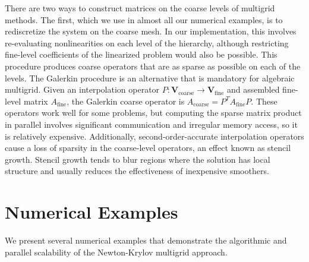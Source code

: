 \documentclass[draft,lineno,jgrga]{AGUTeX}
\newcommand{\VV}{\bm V}
\begin{document}
\begin{article}
There are two ways to construct matrices on the coarse levels of multigrid methods.
The first, which we use in almost all our numerical examples, is to rediscretize the system on the coarse mesh.
In our implementation, this involves re-evaluating nonlinearities on each level of the hierarchy, although restricting fine-level coefficients of the linearized problem would also be possible.
This procedure produces coarse operators that are as sparse as possible on each of the levels.
The Galerkin procedure is an alternative that is mandatory for algebraic multigrid.
Given an interpolation operator $P: \VV_{\text{coarse}} \to \VV_{\text{fine}}$ and assembled fine-level matrix $A_{\text{fine}}$, the Galerkin coarse operator is $A_{\text{coarse}} = P^T A_{\text{fine}} P$.
These operators work well for some problems, but computing the sparse matrix product in parallel involves significant communication and irregular memory access, so it is relatively expensive.
Additionally, second-order-accurate interpolation operators cause a loss of sparsity in the coarse-level operators, an effect known as stencil growth.
Stencil growth tends to blur regions where the solution has local structure and usually reduces the effectiveness of inexpensive smoothers.

\section{Numerical Examples}\label{sec:examples}

We present several numerical examples that demonstrate the algorithmic and parallel scalability of the Newton-Krylov multigrid approach.


\end{article}
\end{document}
